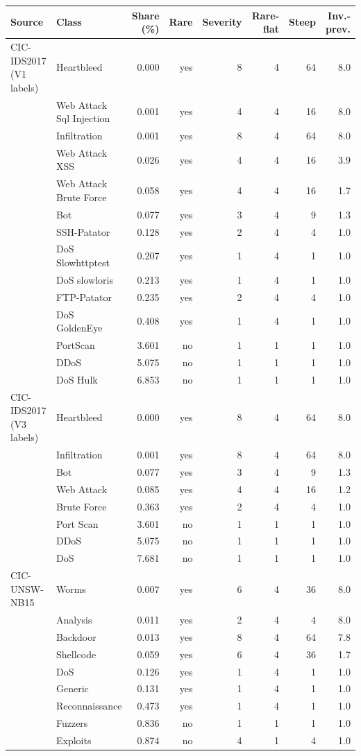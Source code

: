 \begin{tabular}{@{}llrrrrrr@{}}
\toprule
Source & Class & Share (\%) & Rare & Severity & Rare-flat & Steep & Inv.-prev. \\
\midrule
CIC-IDS2017 (V1 labels) & Heartbleed & 0.000 & yes & 8 & 4 & 64 & 8.0 \\
 & Web Attack  Sql Injection & 0.001 & yes & 4 & 4 & 16 & 8.0 \\
 & Infiltration & 0.001 & yes & 8 & 4 & 64 & 8.0 \\
 & Web Attack  XSS & 0.026 & yes & 4 & 4 & 16 & 3.9 \\
 & Web Attack  Brute Force & 0.058 & yes & 4 & 4 & 16 & 1.7 \\
 & Bot & 0.077 & yes & 3 & 4 & 9 & 1.3 \\
 & SSH-Patator & 0.128 & yes & 2 & 4 & 4 & 1.0 \\
 & DoS Slowhttptest & 0.207 & yes & 1 & 4 & 1 & 1.0 \\
 & DoS slowloris & 0.213 & yes & 1 & 4 & 1 & 1.0 \\
 & FTP-Patator & 0.235 & yes & 2 & 4 & 4 & 1.0 \\
 & DoS GoldenEye & 0.408 & yes & 1 & 4 & 1 & 1.0 \\
 & PortScan & 3.601 & no & 1 & 1 & 1 & 1.0 \\
 & DDoS & 5.075 & no & 1 & 1 & 1 & 1.0 \\
 & DoS Hulk & 6.853 & no & 1 & 1 & 1 & 1.0 \\
\addlinespace
CIC-IDS2017 (V3 labels) & Heartbleed & 0.000 & yes & 8 & 4 & 64 & 8.0 \\
 & Infiltration & 0.001 & yes & 8 & 4 & 64 & 8.0 \\
 & Bot & 0.077 & yes & 3 & 4 & 9 & 1.3 \\
 & Web Attack & 0.085 & yes & 4 & 4 & 16 & 1.2 \\
 & Brute Force & 0.363 & yes & 2 & 4 & 4 & 1.0 \\
 & Port Scan & 3.601 & no & 1 & 1 & 1 & 1.0 \\
 & DDoS & 5.075 & no & 1 & 1 & 1 & 1.0 \\
 & DoS & 7.681 & no & 1 & 1 & 1 & 1.0 \\
\addlinespace
CIC-UNSW-NB15 & Worms & 0.007 & yes & 6 & 4 & 36 & 8.0 \\
 & Analysis & 0.011 & yes & 2 & 4 & 4 & 8.0 \\
 & Backdoor & 0.013 & yes & 8 & 4 & 64 & 7.8 \\
 & Shellcode & 0.059 & yes & 6 & 4 & 36 & 1.7 \\
 & DoS & 0.126 & yes & 1 & 4 & 1 & 1.0 \\
 & Generic & 0.131 & yes & 1 & 4 & 1 & 1.0 \\
 & Reconnaissance & 0.473 & yes & 1 & 4 & 1 & 1.0 \\
 & Fuzzers & 0.836 & no & 1 & 1 & 1 & 1.0 \\
 & Exploits & 0.874 & no & 4 & 1 & 4 & 1.0 \\
\bottomrule
\end{tabular}
